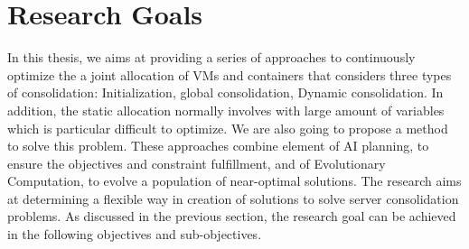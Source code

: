 \section{Research Goals}
In this thesis, we aims at providing a series of approaches to continuously optimize the a joint allocation of VMs and containers that considers three types of consolidation: Initialization, global consolidation, Dynamic consolidation. In addition, the static allocation normally involves with large amount of variables which is particular difficult to optimize. We are also going to propose a method to solve this problem.  These approaches combine element of AI planning, to ensure the objectives and constraint fulfillment, and of Evolutionary Computation, to evolve a population of near-optimal solutions. The research aims at determining a flexible way in creation of solutions to solve server consolidation problems. As discussed in the previous section, the research goal can be achieved in the following objectives and sub-objectives.

